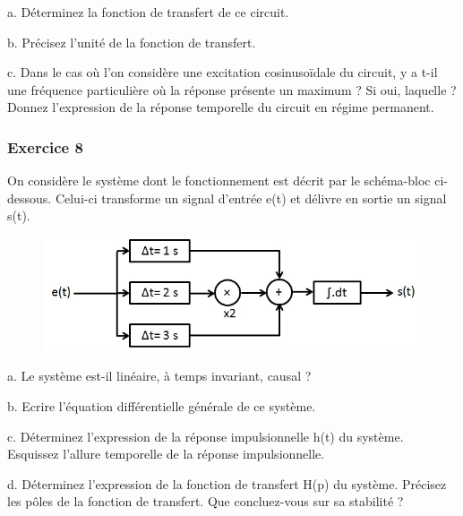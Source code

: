 	a. Déterminez la fonction de transfert de ce circuit. 
	
	b. Précisez l'unité de la fonction de transfert. 
	
	c. Dans le cas où l'on considère une excitation cosinusoïdale du circuit, y a t-il une fréquence particulière où la réponse présente un maximum ? Si oui, laquelle ? Donnez l'expression de la réponse temporelle du circuit en régime permanent.
	
	\vspace{1\baselineskip}
	
	\subsubsection{Exercice 8}
	
	On considère le système dont le fonctionnement est décrit par le schéma-bloc ci-dessous. Celui-ci transforme un signal d'entrée e(t) et délivre en sortie un signal s(t). 
	
	\begin{figure}[h!]
		\centering
		\includegraphics[scale=0.5]{images/Exo_2_6.jpg} 
	\end{figure}
	
	a. Le système est-il linéaire, à temps invariant, causal ?
	
	b. Ecrire l'équation différentielle générale de ce système.
	
	c. Déterminez l'expression de la réponse impulsionnelle h(t) du système. Esquissez l'allure temporelle de la réponse impulsionnelle. 
	
	d. Déterminez l'expression de la fonction de transfert H(p) du système. Précisez les pôles de la fonction de transfert. Que concluez-vous sur sa stabilité ?
	

	



	